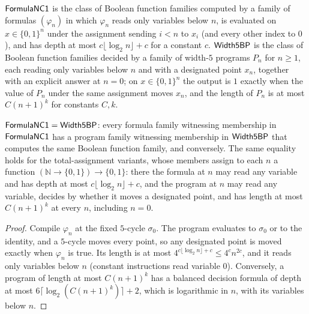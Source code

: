 \begin{definition}
  \label{def:circuits-formula-nc1}
  \leanok
  $\mathsf{FormulaNC1}$ is the class of Boolean function families computed by a
  family of formulas $(\varphi_n)$ in which $\varphi_n$ reads only variables
  below $n$, is evaluated on $x \in \{0,1\}^n$ under the assignment sending
  $i < n$ to $x_i$ (and every other index to $0$), and has depth at most
  $c \lfloor \log_2 n \rfloor + c$ for a constant $c$. $\mathsf{Width5BP}$ is the
  class of Boolean function families decided by a family of width-$5$
  programs $P_n$ for $n \ge 1$, each reading only variables below $n$ and with
  a designated point $x_n$, together with an explicit answer at $n = 0$; on
  $x \in \{0,1\}^n$ the output is $1$ exactly when the value of $P_n$ under
  the same assignment moves $x_n$, and the length of $P_n$ is at most
  $C (n + 1)^k$ for constants $C, k$.
\end{definition}

\begin{theorem}[Barrington]
  \label{thm:circuits-barrington}
  \leanok
  $\mathsf{FormulaNC1} = \mathsf{Width5BP}$: every formula family witnessing
  membership in $\mathsf{FormulaNC1}$ has a program family witnessing membership in
  $\mathsf{Width5BP}$ that computes the same Boolean function family, and
  conversely. The same equality holds for the total-assignment variants, whose
  members assign to each $n$ a function $(\mathbb{N} \to \{0,1\}) \to \{0,1\}$:
  there the formula at $n$ may read any variable and has depth at most
  $c \lfloor \log_2 n \rfloor + c$, and the program at $n$ may read any
  variable, decides by whether it moves a designated point, and has length at
  most $C (n + 1)^k$ at every $n$, including $n = 0$.
\end{theorem}
\begin{proof}
  \leanok
  Compile $\varphi_n$ at the fixed $5$-cycle $\sigma_0$. The program evaluates
  to $\sigma_0$ or to the identity, and a $5$-cycle moves every point, so any
  designated point is moved exactly when $\varphi_n$ is true. Its length is at
  most $4^{c \lfloor \log_2 n \rfloor + c} \le 4^c n^{2c}$, and it reads only
  variables below $n$ (constant instructions read variable $0$). Conversely,
  a program of length at most $C (n + 1)^k$ has a balanced decision formula of
  depth at most $6 \lceil \log_2 (C (n + 1)^k) \rceil + 2$, which is
  logarithmic in $n$, with its variables below $n$.
\end{proof}

